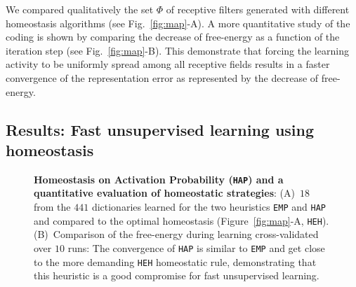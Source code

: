 \documentclass[draft]{article} %
\newcommand{\dico}{\Phi} %
\newcommand{\seeFig}[1]{Figure~\ref{fig:#1}}%
\begin{document}
We compared qualitatively the set $\dico$ of receptive filters generated with different homeostasis algorithms (see Fig.~\ref{fig:map}-A). A more quantitative study of the coding is shown by comparing the decrease of free-energy as a function of the iteration step (see Fig.~\ref{fig:map}-B). This demonstrate that forcing the learning activity to be uniformly spread among all receptive fields results in a faster convergence of the representation error as represented by the decrease of free-energy. %
\subsection{Results: Fast unsupervised learning using homeostasis}\label{results}
\begin{figure}[!ht]%
\caption{
{\bf Homeostasis on Activation Probability (\texttt{HAP}) and a quantitative evaluation of homeostatic strategies}: %
 {\sf (A)}~$18$ from the $441$ dictionaries learned for the two heuristics \texttt{EMP} and \texttt{HAP} and compared to the optimal homeostasis (\seeFig{map}-A, \texttt{HEH}). {\sf (B)}~Comparison of the free-energy during learning cross-validated over $10$ runs: The convergence of \texttt{HAP} is similar to \texttt{EMP} and get close to the more demanding \texttt{HEH} homeostatic rule, demonstrating that this heuristic is a good compromise for fast unsupervised learning.
\label{fig:HAP}}%
\end{figure}%
\end{document}
